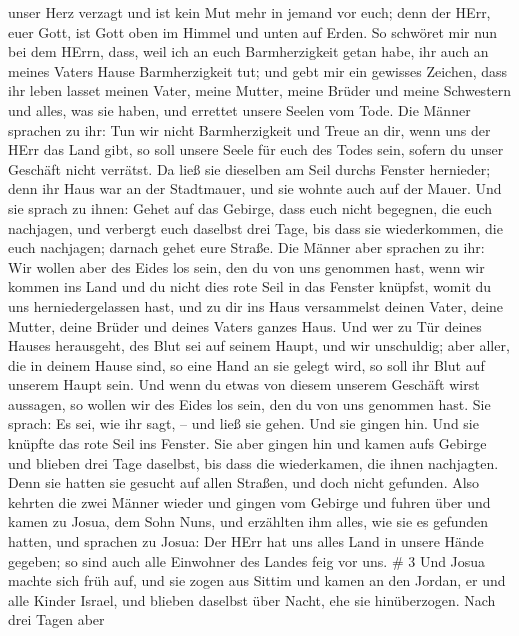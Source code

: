 unser Herz verzagt und ist kein Mut mehr in jemand vor euch; denn der
HErr, euer Gott, ist Gott oben im Himmel und unten auf Erden.
 So schwöret mir nun bei dem HErrn, dass, weil ich an euch
Barmherzigkeit getan habe, ihr auch an meines Vaters Hause
Barmherzigkeit tut; und gebt mir ein gewisses Zeichen, 
dass ihr leben lasset meinen Vater, meine Mutter, meine Brüder und meine
Schwestern und alles, was sie haben, und errettet unsere Seelen vom
Tode.  Die Männer sprachen zu ihr: Tun wir nicht
Barmherzigkeit und Treue an dir, wenn uns der HErr das Land gibt, so
soll unsere Seele für euch des Todes sein, sofern du unser Geschäft
nicht verrätst.  Da ließ sie dieselben am Seil durchs
Fenster hernieder; denn ihr Haus war an der Stadtmauer, und sie wohnte
auch auf der Mauer.  Und sie sprach zu ihnen: Gehet auf das
Gebirge, dass euch nicht begegnen, die euch nachjagen, und verbergt euch
daselbst drei Tage, bis dass sie wiederkommen, die euch nachjagen;
darnach gehet eure Straße.  Die Männer aber sprachen zu
ihr: Wir wollen aber des Eides los sein, den du von uns genommen hast,
 wenn wir kommen ins Land und du nicht dies rote Seil in
das Fenster knüpfst, womit du uns herniedergelassen hast, und zu dir ins
Haus versammelst deinen Vater, deine Mutter, deine Brüder und deines
Vaters ganzes Haus.  Und wer zu Tür deines Hauses
herausgeht, des Blut sei auf seinem Haupt, und wir unschuldig; aber
aller, die in deinem Hause sind, so eine Hand an sie gelegt wird, so
soll ihr Blut auf unserem Haupt sein.  Und wenn du etwas
von diesem unserem Geschäft wirst aussagen, so wollen wir des Eides los
sein, den du von uns genommen hast.  Sie sprach: Es sei,
wie ihr sagt, -- und ließ sie gehen. Und sie gingen hin. Und sie knüpfte
das rote Seil ins Fenster.  Sie aber gingen hin und kamen
aufs Gebirge und blieben drei Tage daselbst, bis dass die wiederkamen,
die ihnen nachjagten. Denn sie hatten sie gesucht auf allen Straßen, und
doch nicht gefunden.  Also kehrten die zwei Männer wieder
und gingen vom Gebirge und fuhren über und kamen zu Josua, dem Sohn
Nuns, und erzählten ihm alles, wie sie es gefunden hatten, 
und sprachen zu Josua: Der HErr hat uns alles Land in unsere Hände
gegeben; so sind auch alle Einwohner des Landes feig vor uns. \# 3
 Und Josua machte sich früh auf, und sie zogen aus Sittim
und kamen an den Jordan, er und alle Kinder Israel, und blieben daselbst
über Nacht, ehe sie hinüberzogen.  Nach drei Tagen aber
